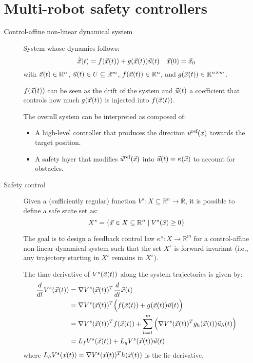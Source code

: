 \chapter{Multi-robot safety controllers}


\begin{description}
    \item[Control-affine non-linear dynamical system] 
        System whose dynamics follows:
        \[
            \dot{{\vec{x}}}(t) = f({\vec{x}}(t)) + g({\vec{x}}(t)) {\vec{u}}(t) \quad {\vec{x}}(0) = {\vec{x}}_0
        \]
        with ${\vec{x}}(t) \in \mathbb{R}^n$, ${\vec{u}}(t) \in U \subseteq \mathbb{R}^m$, $f({\vec{x}}(t)) \in \mathbb{R}^n$, and $g({\vec{x}}(t)) \in \mathbb{R}^{n \times m}$.

        $f({\vec{x}}(t))$ can be seen as the drift of the system and ${\vec{u}}(t)$ a coefficient that controls how much $g({\vec{x}}(t))$ is injected into $f({\vec{x}}(t))$.

        The overall system can be interpreted as composed of:
        \begin{itemize}
            \item A high-level controller that produces the direction ${\vec{u}}^\text{ref}({\vec{x}})$ towards the target position.
            \item A safety layer that modifies ${\vec{u}}^\text{ref}({\vec{x}})$ into ${\vec{u}}(t) = \kappa({\vec{x}})$ to account for obstacles.
        \end{itemize}

    \item[Safety control] 
        Given a (sufficiently regular) function $V^s: X \subseteq \mathbb{R}^n \rightarrow \mathbb{R}$, it is possible to define a safe state set as:
        \[
            X^s = \{ {\vec{x}} \in X \subseteq \mathbb{R}^n \mid V^s({\vec{x}}) \geq 0 \}
        \]

        The goal is to design a feedback control law $\kappa^s: X \rightarrow \mathbb{R}^m$ for a control-affine non-linear dynamical system such that the set $X^s$ is forward invariant (i.e., any trajectory starting in $X^s$ remains in $X^s$).

        \begin{remark}
            The time derivative of $V^s({\vec{x}}(t))$ along the system trajectories is given by:
            \[
                \begin{split}
                    \frac{d}{dt} V^s({\vec{x}}(t)) 
                    &= \nabla V^s({\vec{x}}(t))^T \frac{d}{dt} {\vec{x}}(t) \\
                    &= \nabla V^s({\vec{x}}(t))^T \Big( f({\vec{x}}(t)) + g({\vec{x}}(t)) {\vec{u}}(t) \Big) \\
                    &= \nabla V^s({\vec{x}}(t))^T f({\vec{x}}(t)) + \sum_{h=1}^{m} \Big( \nabla V^s({\vec{x}}(t))^T g_h({\vec{x}}(t)) {\vec{u}}_h(t) \Big)\\
                    &= L_f V^s({\vec{x}}(t)) + L_g V^s({\vec{x}}(t)) {\vec{u}}(t) \\
                \end{split}
            \]
            where $L_h V^s({\vec{x}}(t)) = \nabla V^s({\vec{x}}(t))^T h({\vec{x}}(t))$ is the lie derivative.
        \end{remark}


\end{description}
